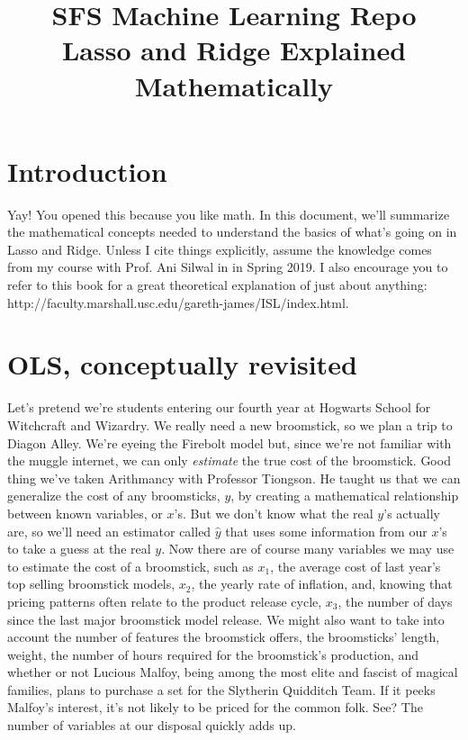 \documentclass{article}                 %
\title{ SFS Machine Learning Repo \\ Lasso and Ridge Explained Mathematically }
\author{}
\date{}                    							%
\begin{document}
	\maketitle
	\tableofcontents       %

	\newpage

\section{Introduction}
	Yay! You opened this because you like math. In this document, we'll summarize the mathematical concepts needed to understand the basics of what's going on in Lasso and Ridge. Unless I cite things explicitly, assume the knowledge comes from my course with Prof. Ani Silwal in in Spring 2019. I also encourage you to refer to this book for a great theoretical explanation of just about anything: http://faculty.marshall.usc.edu/gareth-james/ISL/index.html.

\newpage
\section{OLS, conceptually revisited}
	Let's pretend we're students entering our fourth year at Hogwarts School for Witchcraft and Wizardry. We really need a new broomstick, so we plan a trip to Diagon Alley. We're eyeing the Firebolt model but, since we're not familiar with the muggle internet, we can only \textit{estimate} the true cost of the broomstick. Good thing we've taken Arithmancy with Professor Tiongson. He taught us that we can generalize the cost of any broomsticks, $y$, by creating a mathematical relationship between known variables, or $x$'s. But we don't know what the real $y$'s actually are, so we'll need an estimator called $\hat{y}$ that uses some information from our $x$'s to take a guess at the real $y$. Now there are of course many variables we may use to estimate the cost of a broomstick, such as $x_1$, the average cost of last year's top selling broomstick models, $x_2$, the yearly rate of inflation, and, knowing that pricing patterns often relate to the product release cycle, $x_3$, the number of days since the last major broomstick model release. We might also want to take into account the number of features the broomstick offers, the broomsticks' length, weight, the number of hours required for the broomstick's production, and whether or not Lucious Malfoy, being among the most elite and fascist of magical families, plans to purchase a set for the Slytherin Quidditch Team. If it peeks Malfoy's interest, it's not likely to be priced for the common folk. See? The number of variables at our disposal quickly adds up.
\end{document}
